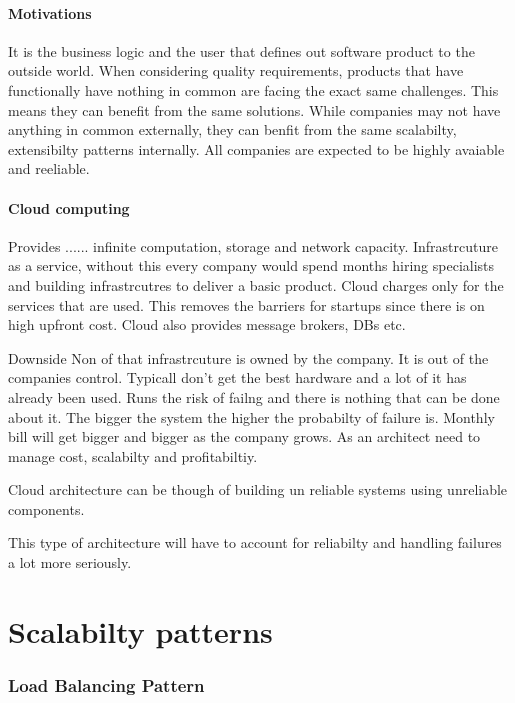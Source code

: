 \documentclass[a4paper, 11pt]{book}
\begin{document}
    \paragraph{Motivations}
    It is the business logic and the user that defines out software product to the outside world.
    When considering quality requirements, products that have functionally have nothing in common are facing the exact same challenges.
    This means they can benefit from the same solutions.
    While companies may not have anything in common externally, they can benfit from the same scalabilty, extensibilty patterns internally.
    All companies are expected to be highly avaiable and reeliable.

    \paragraph{Cloud computing}
    Provides ...... infinite computation, storage and network capacity.
    Infrastrcuture as a service, without this every company would spend months hiring specialists and building infrastrcutres to deliver a basic product.
    Cloud charges only for the services that are used.
    This removes the barriers for startups since there is on high upfront cost.
    Cloud also provides message brokers, DBs etc.

    Downside
    Non of that infrastrcuture is owned by the company. It is out of the companies control.
    Typicall don't get the best hardware and a lot of it has already been used.
    Runs the risk of failng and there is nothing that can be done about it.
    The bigger the system the higher the probabilty of failure is.
    Monthly bill will get bigger and bigger as the company grows.
    As an architect need to manage cost, scalabilty and profitabiltiy.

    Cloud architecture can be though of building un reliable systems using unreliable components.

    This type of architecture will have to account for reliabilty and handling failures a lot more seriously.

    \section{Scalabilty patterns}

    \subsubsection{Load Balancing Pattern}
\end{document}
